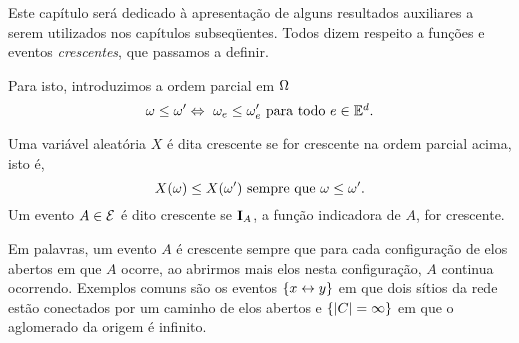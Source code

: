 Este capítulo será dedicado à apresentação de alguns resultados auxiliares 
a serem utilizados nos capítulos subseqüentes.
Todos dizem respeito a funções e eventos {\em crescentes}, que passamos a definir.

Para isto, introduzimos a ordem parcial em $\Omega$
$$\om\leq\om'\Leftrightarrow\ \om_e\leq\om'_e\,\,\mbox{para todo $e\in\ed$}.$$ 

Uma variável aleatória $X$
é dita crescente se for crescente na ordem parcial acima, isto é,
$$X(\omega)\leq X(\omega')\,\,\mbox{sempre que}\,\,\omega\leq\omega'.$$ 
Um evento $A\in{\cal E}$ é dito crescente se $\mbox{\bf I}_A$, a função indicadora
de $A$, for crescente.

Em palavras, um evento $A$ é crescente sempre que para cada configuração de
elos abertos em que $A$ ocorre, ao abrirmos mais elos nesta configuração,
$A$ continua ocorrendo. Exemplos comuns são os eventos $\{x\leftrightarrow y\}$ em 
que dois sítios da rede estão conectados por um caminho de elos abertos
e $\{|C|=\infty\}$ em que o aglomerado da origem é infinito. 
